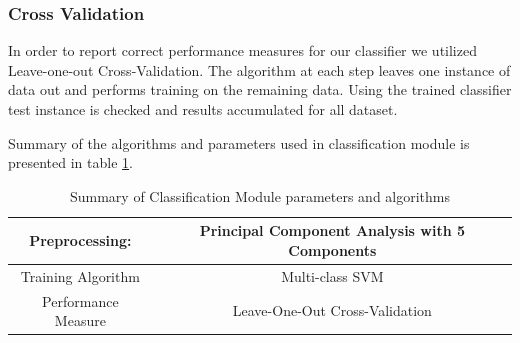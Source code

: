 \subsubsection*{Cross Validation}
In order to report correct performance measures for our classifier we utilized Leave-one-out Cross-Validation. The algorithm at each step leaves one instance of data out and performs training on the remaining data. Using the trained classifier test instance is checked and results accumulated for all dataset.

Summary of the algorithms and parameters used in classification module is presented in table \ref{tbl:classification}.
\begin{table}
\begin{tabular}{|c|c|}
\hline 
Preprocessing: & Principal Component Analysis with 5 Components \\ 
\hline 
Training Algorithm & Multi-class SVM \\ 
\hline 
Performance Measure & Leave-One-Out Cross-Validation \\ 
\hline 

\end{tabular} 
\caption{Summary of Classification Module parameters and algorithms}
\label{tbl:classification}
\end{table}